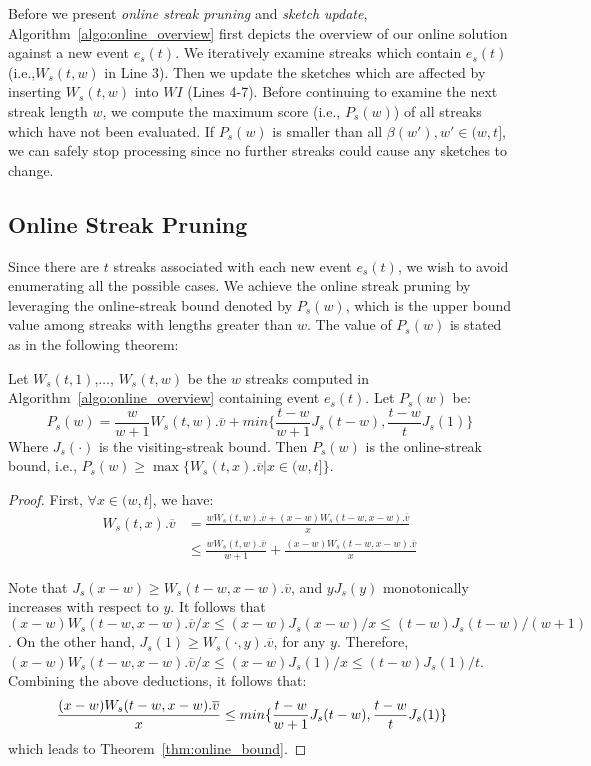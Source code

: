 Before we present \emph{online streak pruning} and \emph{sketch update}, 
Algorithm~\ref{algo:online_overview} first 
depicts the overview of our online solution against a new event $e_s(t)$. 
We iteratively examine 
streaks which contain $e_s(t)$ (i.e.,$W_s(t,w)$ in Line 3). 
Then we update the sketches which are affected by inserting $W_s(t,w)$ into $WI$ (Lines 4-7).
Before continuing to examine the next streak length $w$,
we compute the maximum score (i.e., $P_s(w)$) of all streaks which have not been evaluated. 
If $P_s(w)$ is smaller than all $\beta(w'), w' \in (w,t]$, 
we can safely stop processing since no further streaks could cause any sketches to change.

\subsection{Online Streak Pruning}
Since there are $t$ streaks associated with each new event $e_s(t)$, 
we wish to avoid enumerating all the possible cases. 
We achieve the online streak pruning by leveraging the online-streak bound denoted by $P_s(w)$, which
is the upper bound value among streaks with lengths greater than $w$. 
The value of $P_s(w)$ is stated as in the following theorem:

\begin{theorem}
\label{thm:online_bound}
Let $W_s(t,1)$,$\ldots$, $W_s(t,w)$ be the $w$ streaks computed in Algorithm~\ref{algo:online_overview} containing event $e_s(t)$. Let $P_s(w)$ be:
\begin{equation}
	P_s(w) = \frac{w}{w+1}W_s(t,w).\overline{v}+ min\{\frac{t-w}{w+1}J_s(t-w), \frac{t-w}{t}J_s(1) \}
\end{equation}
Where $J_s(\cdot)$ is the visiting-streak bound.  Then $P_s(w)$ is the online-streak bound, i.e., $P_s(w) \geq \max\{W_s(t,x).\overline{v}| x \in (w,t]\}$.
\end{theorem}
\begin{proof}
First, $\forall x \in (w,t]$, we have: 
\begin{align*}
W_s(t,x).\overline{v} &= \frac{wW_s(t,w).\overline{v} + (x-w)W_s(t-w,x-w).\overline{v}}{x} \\
& \leq \frac{wW_s(t,w).\overline{v}}{w+1} + \frac{(x-w)W_s(t-w,x-w).\overline{v}}{x}
\end{align*}

Note that $J_s(x-w) \geq W_s(t-w, x-w).\overline{v}$, and $yJ_s(y)$ monotonically increases with respect to $y$.
It follows that $(x-w)W_s(t-w,x-w).\overline{v}/{x} \leq (x-w)J_s(x-w)/{x} \leq (t-w)J_s(t-w)/(w+1)$.
%
On the other hand, $J_s(1)\geq W_s(\cdot,y).\overline{v}$, for any $y$. Therefore,
$(x-w)W_s(t-w,x-w).\overline{v}/{x} \leq (x-w)J_s(1)/x \leq (t-w)J_s(1)/t$.
Combining the above deductions, it follows that:
\begin{equation*}
\hspace{-4mm}\frac{(x-w)W_s(t-w,x-w).\overline{v}}{x} \leq min\{\frac{t-w}{w+1}J_s(t-w), \frac{t-w}{t}J_s(1) \}
\end{equation*}
which leads to Theorem~\ref{thm:online_bound}. 
\end{proof}

